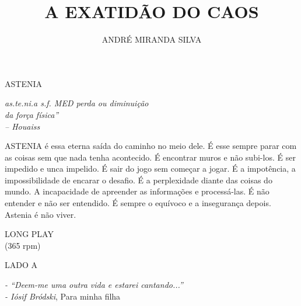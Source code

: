 \documentclass[20pt]{book}
\title{A EXATIDÃO DO CAOS}
\author{ANDRÉ MIRANDA SILVA}
\date{}
\begin{document}
\maketitle

\newpage
\thispagestyle{empty}
\mbox{}
\newpage

\vspace*{\fill}
\begin{center}\Large{ASTENIA}\end{center}
\begin{flushright}
\textit{
as.te.ni.a s.f. MED perda ou diminuição\\
da força física”\\
– Houaiss}
\end{flushright}
\vspace{\fill}

\clearpage
ASTENIA é essa eterna saída do caminho no meio dele. É esse
sempre parar com as coisas sem que nada tenha acontecido. É
encontrar muros e não subi-los. É ser impedido e unca impelido. É
sair do jogo sem começar a jogar. É a impotência, a impossibilidade
de encarar o desafio. É a perplexidade diante das coisas do mundo. A
incapacidade de apreender as informações e processá-las. É não
entender e não ser entendido. É sempre o equívoco e a insegurança
depois. Astenia é não viver.
\clearpage

\clearpage

\clearpage

\clearpage

\clearpage

\clearpage

\clearpage

\clearpage

\clearpage

\clearpage

\clearpage

\clearpage

\clearpage

\clearpage

\clearpage

\clearpage

\clearpage

\par\null\vfill
\begin{center}
\Large{
LONG PLAY\\
(365 rpm)}
\end{center}

\clearpage

\vspace*{\fill}
\begin{center}
\Large{
LADO A}
\end{center}
\begin{flushright}
\large{
\textit{- “Deem-me uma outra vida e estarei cantando...”\\
- Iósif Bródski}, Para minha filha
}
\end{flushright}
\vspace{\fill}
\end{document}
